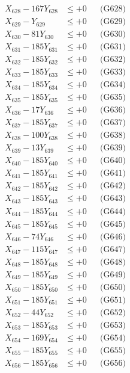 \documentclass[a4paper,10pt]{article}
\begin{document}
{\begin{align}
X_{628} - 167Y_{628} &\leq +0 && \text{(G628)} \\
X_{629} - Y_{629} &\leq +0 && \text{(G629)} \\
X_{630} - 81Y_{630} &\leq +0 && \text{(G630)} \\
\allowbreak
X_{631} - 185Y_{631} &\leq +0 && \text{(G631)} \\
X_{632} - 185Y_{632} &\leq +0 && \text{(G632)} \\
X_{633} - 185Y_{633} &\leq +0 && \text{(G633)} \\
X_{634} - 185Y_{634} &\leq +0 && \text{(G634)} \\
X_{635} - 185Y_{635} &\leq +0 && \text{(G635)} \\
X_{636} - 17Y_{636} &\leq +0 && \text{(G636)} \\
X_{637} - 185Y_{637} &\leq +0 && \text{(G637)} \\
X_{638} - 100Y_{638} &\leq +0 && \text{(G638)} \\
X_{639} - 13Y_{639} &\leq +0 && \text{(G639)} \\
X_{640} - 185Y_{640} &\leq +0 && \text{(G640)} \\
\allowbreak
X_{641} - 185Y_{641} &\leq +0 && \text{(G641)} \\
X_{642} - 185Y_{642} &\leq +0 && \text{(G642)} \\
X_{643} - 185Y_{643} &\leq +0 && \text{(G643)} \\
X_{644} - 185Y_{644} &\leq +0 && \text{(G644)} \\
X_{645} - 185Y_{645} &\leq +0 && \text{(G645)} \\
X_{646} - 74Y_{646} &\leq +0 && \text{(G646)} \\
X_{647} - 115Y_{647} &\leq +0 && \text{(G647)} \\
X_{648} - 185Y_{648} &\leq +0 && \text{(G648)} \\
X_{649} - 185Y_{649} &\leq +0 && \text{(G649)} \\
X_{650} - 185Y_{650} &\leq +0 && \text{(G650)} \\
\allowbreak
X_{651} - 185Y_{651} &\leq +0 && \text{(G651)} \\
X_{652} - 44Y_{652} &\leq +0 && \text{(G652)} \\
X_{653} - 185Y_{653} &\leq +0 && \text{(G653)} \\
X_{654} - 169Y_{654} &\leq +0 && \text{(G654)} \\
X_{655} - 185Y_{655} &\leq +0 && \text{(G655)} \\
X_{656} - 185Y_{656} &\leq +0 && \text{(G656)} \\

\end{align}}
\end{document}
